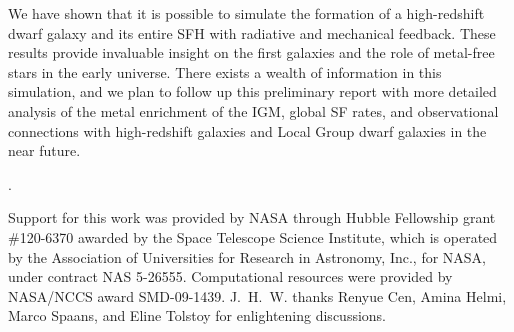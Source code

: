 \documentclass[12pt]{article}
\newcommand{\tvir}{\ifmmode{T_{\rm{vir}}}\else{$T_{\rm{vir}}$}\fi}
\newcounter{lastnote}
\newenvironment{scilastnote}{%
\setcounter{lastnote}{\value{enumiv}}%
\addtocounter{lastnote}{+1}%
\begin{list}%
{\arabic{lastnote}.}
{\setlength{\leftmargin}{.22in}}
{\setlength{\labelsep}{.5em}}}
{\end{list}}
\begin{document}

We have shown that it is possible to simulate the formation of a
high-redshift dwarf galaxy and its entire SFH with radiative and
mechanical feedback.  These results provide invaluable insight on the
first galaxies and the role of metal-free stars in the early universe.
There exists a wealth of information in this simulation, and we plan
to follow up this preliminary report with more detailed analysis of
the metal enrichment of the IGM, global SF rates, and observational
connections with high-redshift galaxies and Local Group dwarf galaxies
in the near future.





\begin{scilastnote}
\item Support for this work was provided by NASA through Hubble Fellowship
grant \#120-6370 awarded by the Space Telescope Science Institute,
which is operated by the Association of Universities for Research in
Astronomy, Inc., for NASA, under contract NAS 5-26555.  Computational
resources were provided by NASA/NCCS award SMD-09-1439.
J.~H.~W. thanks Renyue Cen, Amina Helmi, Marco Spaans, and Eline
Tolstoy for enlightening discussions.
\end{scilastnote}
\end{document}
